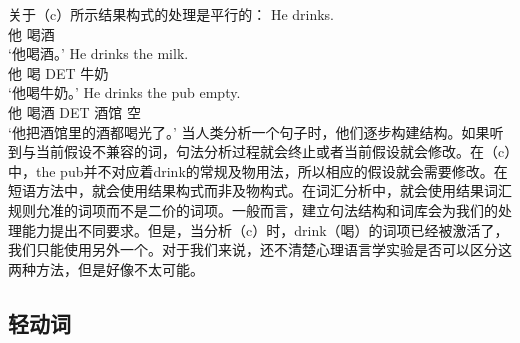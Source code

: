 \begin{exe}
\begin{xlist}[iv.]
\begin{exe}
\begin{xlist}[iv.]
关于（c）所示结果构式的处理是平行的：
\eal
\ex
\gll He drinks.\\
     他 喝酒\\
\glt `他喝酒。' 
\ex
\gll He drinks the milk.\\
     他 喝 DET 牛奶\\
\glt `他喝牛奶。' 
\ex
\gll He drinks the pub empty.\\
     他 喝酒 DET 酒馆 空\\
\glt `他把酒馆里的酒都喝光了。' 
\zl
当人类分析一个句子时，他们逐步构建结构。如果听到与当前假设不兼容的词，句法分析过程就会终止或者当前假设就会修改。在（c）中，the pub并不对应着drink的常规及物用法，所以相应的假设就会需要修改。在短语方法中，就会使用结果构式而非及物构式。在词汇分析中，就会使用结果词汇规则允准的词项而不是二价的词项。一般而言，建立句法结构和词库会为我们的处理能力提出不同要求。但是，当分析（c）时，drink（喝）的词项已经被激活了，我们只能使用另外一个。对于我们来说，还不清楚心理语言学实验是否可以区分这两种方法，但是好像不太可能。

\subsection{轻动词}
\label{sec-psycho-lv}


\end{xlist}
\end{exe}
\end{xlist}
\end{exe}
